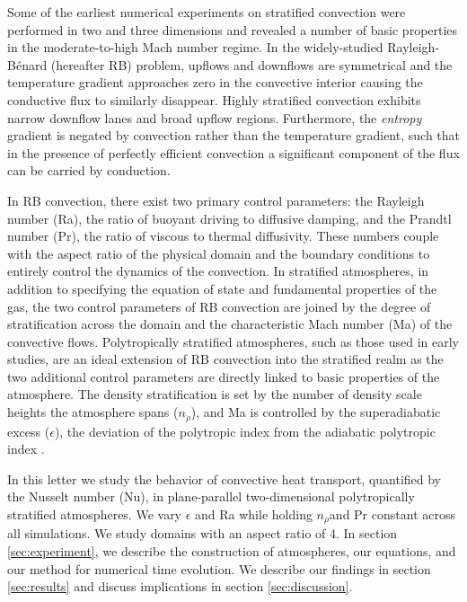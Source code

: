 \documentclass[aps, prl, twocolumn, groupedaddress, amsfonts, amssymb, amsmath]{revtex4-1}
\newcommand{\RB}{Rayleigh-B\'{e}nard }
\newcommand{\nrho}{\ensuremath{n_{\rho}}}
\begin{document}
Some of the earliest numerical experiments on stratified convection
were performed in two \cite{graham1975, chan&all1982,
hurlburt&all1984, cattaneo&all1990} and three \cite{cattaneo&all1991, brummell&all1996} dimensions and
revealed a number of basic properties in the moderate-to-high Mach number regime.
In the widely-studied \RB (hereafter RB) problem, upflows and downflows are symmetrical and
the temperature gradient approaches zero in the convective interior causing the conductive flux to similarly 
disappear.  Highly stratified convection exhibits narrow downflow lanes and broad upflow regions.
Furthermore, the \emph{entropy} gradient is negated by convection rather than the temperature gradient, such
that in the presence of perfectly efficient convection a significant component of the flux can be
carried by conduction.

In RB convection, there exist two primary control parameters: the Rayleigh number (Ra), the ratio of
buoyant driving to diffusive damping, and the Prandtl number (Pr), the ratio of viscous to thermal
diffusivity.  These numbers couple with the aspect ratio of the physical domain and the boundary conditions
to entirely control the
dynamics of the convection.  In stratified atmospheres, in addition to specifying the equation of state and
fundamental properties of the gas, the two control parameters of RB convection are joined by the degree of
stratification across the domain and the characteristic Mach number (Ma) of the convective flows.  
Polytropically stratified atmospheres, such as those used in early studies, are an ideal extension of
RB convection into the stratified realm as the two additional control parameters are directly linked to
basic properties of the atmosphere.  The density stratification is set by the number of density scale heights
the atmosphere spans (\nrho), and Ma is controlled by the superadiabatic excess ($\epsilon$),
the deviation of the polytropic index from the adiabatic polytropic index \cite{graham1975}.

In this letter we study the behavior of convective heat transport, quantified by
the Nusselt number (Nu), in plane-parallel two-dimensional polytropically stratified atmospheres.  
We vary $\epsilon$ and Ra while holding \nrho and Pr
constant across all simulations.  We study domains with an aspect ratio of 4.  In section 
\ref{sec:experiment}, we describe the construction of atmospheres, our equations, and our method for
numerical time evolution.  We describe our findings in section \ref{sec:results} and discuss
implications in section \ref{sec:discussion}.
\end{document}
